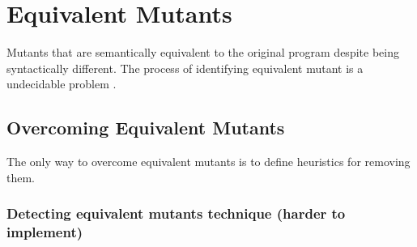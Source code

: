 
\section{Equivalent Mutants}
\label{sec:equivalent}

Mutants that are semantically equivalent to the original program despite being syntactically different. The process of identifying equivalent mutant is a undecidable problem \cite{madeyski2013overcoming}.

\subsection{Overcoming Equivalent Mutants} %
\label{sub:overcoming_equivalent_mutants}

The only way to overcome equivalent mutants is to define heuristics for removing them.

\subsubsection{Detecting equivalent mutants technique (harder to implement)}

